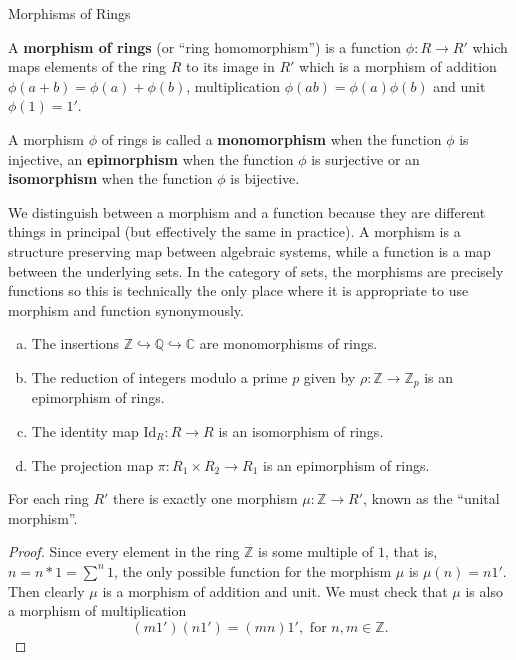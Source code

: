 
\begin{section}{Morphisms of Rings}

\begin{defn}
A {\bf morphism of rings} (or ``ring homomorphism'') is a function $\phi \colon R \to R'$ which maps elements of the ring $R$ to its image in $R'$ which is a morphism of addition $\phi(a+b) = \phi(a) + \phi(b)$, multiplication $\phi(ab) = \phi(a)\phi(b)$ and unit $\phi(1) = 1'$.
\end{defn}

\begin{defn}
A morphism $\phi$ of rings is called a {\bf monomorphism} when the function $\phi$ is injective, an {\bf epimorphism} when the function $\phi$ is surjective or an {\bf isomorphism} when the function $\phi$ is bijective. 
\end{defn}

\begin{danger}
We distinguish between a morphism and a function because they are different things in principal (but effectively the same in practice). A morphism is a structure preserving map between algebraic systems, while a function is a map between the underlying sets. In the category of sets, the morphisms are precisely functions so this is technically the only place where it is appropriate to use morphism and function synonymously.
\end{danger} 

\begin{ex}
\begin{enumerate}[(a)]
\item The insertions $\mathbb{Z} \hookrightarrow \mathbb{Q} \hookrightarrow \mathbb{C}$ are monomorphisms of rings.
\item The reduction of integers modulo a prime $p$ given by $\rho \colon \mathbb{Z} \to \mathbb{Z}_{p}$ is an epimorphism of rings.
\item The identity map $\textrm{Id}_{R} \colon R \to R$ is an isomorphism of rings.
\item The projection map $\pi \colon R_1 \times R_2 \to R_1$ is an epimorphism of rings.
\end{enumerate}
\end{ex}

\begin{prop}
For each ring $R'$ there is exactly one morphism $\mu \colon \mathbb{Z} \to R'$, known as the ``unital morphism''.
\end{prop}

\begin{proof}
Since every element in the ring $\mathbb{Z}$ is some multiple of $1$, that is, $n = n * 1 = \sum^{n} 1$, the only possible function for the morphism $\mu$ is $\mu(n) = n1'$. Then clearly $\mu$ is a morphism of addition and unit. We must check that $\mu$ is also a morphism of multiplication
 $$(m1')(n1') = (mn)1', \textrm{ for } n,m \in \mathbb{Z}.$$


\end{proof}
\end{section}
